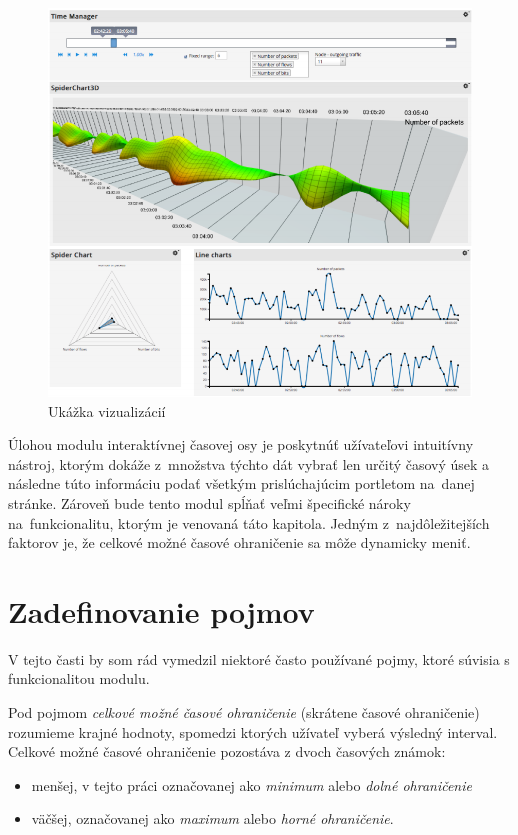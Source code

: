 \documentclass[
  printed, %
  twoside, %
  notable,   %
  nolof,   %
  nolot,   %
]{fithesis3}
\begin{document}
\begin{figure}[H]
	\center
	\includegraphics[width=1.0\linewidth]{visualization}
	\caption{Ukážka vizualizácií\cite{eichler2014analytical}}
	\label{visualization}
\end{figure}

Úlohou modulu interaktívnej časovej osy je poskytnúť užívateľovi intuitívny nástroj, ktorým dokáže z~množstva týchto dát vybrať len určitý časový úsek a následne túto informáciu podať všetkým prislúchajúcim portletom na~danej stránke. Zároveň bude tento modul spĺňať veľmi špecifické nároky na~funkcionalitu, ktorým je venovaná táto kapitola. Jedným z~najdôležitejších faktorov je, že celkové možné časové ohraničenie sa môže dynamicky meniť.

\section{Zadefinovanie pojmov}
V tejto časti by som rád vymedzil niektoré často používané pojmy, ktoré súvisia s funkcionalitou modulu.

Pod pojmom \textit{celkové možné časové ohraničenie} (skrátene časové ohraničenie) rozumieme krajné hodnoty, spomedzi ktorých užívateľ vyberá výsledný interval. Celkové možné časové ohraničenie pozostáva z dvoch časových známok:
\begin{itemize}
\item menšej, v tejto práci označovanej ako \textit{minimum} alebo \textit{dolné ohraničenie}
\item väčšej, označovanej ako \textit{maximum} alebo \textit{horné ohraničenie}.
\end{itemize}
\end{document}
